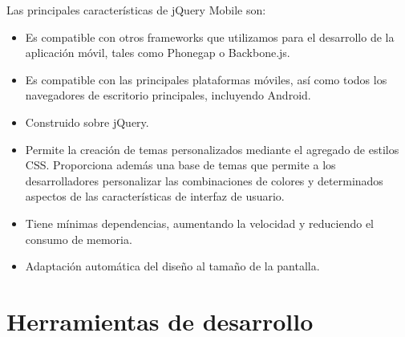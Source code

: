 Las principales características de jQuery Mobile son:

\begin{itemize}
    \item Es compatible con otros frameworks que utilizamos para el desarrollo de la aplicación móvil, tales como Phonegap o Backbone.js.
    \item Es compatible con las principales plataformas móviles, así como todos los navegadores de escritorio principales, incluyendo Android.
    \item Construido sobre jQuery.
    \item Permite la creación de temas personalizados mediante el agregado de estilos CSS. Proporciona además una base de temas que permite a los desarrolladores personalizar las combinaciones de colores y determinados aspectos de las características de interfaz de usuario.
    \item Tiene mínimas dependencias, aumentando la velocidad y reduciendo el consumo de memoria.
    \item Adaptación automática del diseño al tamaño de la pantalla.
 \end{itemize}
 

\section{Herramientas de desarrollo}

